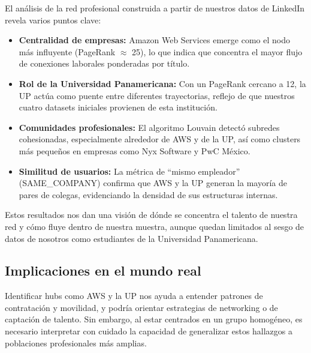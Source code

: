 \documentclass[10pt]{article}
\begin{document}
El análisis de la red profesional construida a partir de nuestros datos de LinkedIn revela varios puntos clave:

\begin{itemize}
	\item \textbf{Centralidad de empresas:} Amazon Web Services emerge como el nodo más influyente (PageRank $\approx$ 25), lo que indica que concentra el mayor flujo de conexiones laborales ponderadas por título.
	\item \textbf{Rol de la Universidad Panamericana:} Con un PageRank cercano a 12, la UP actúa como puente entre diferentes trayectorias, reflejo de que nuestros cuatro datasets iniciales provienen de esta institución.
	\item \textbf{Comunidades profesionales:} El algoritmo Louvain detectó subredes cohesionadas, especialmente alrededor de AWS y de la UP, así como clusters más pequeños en empresas como Nyx Software y PwC México.
	\item \textbf{Similitud de usuarios:} La métrica de “mismo empleador” (SAME\_COMPANY) confirma que AWS y la UP generan la mayoría de pares de colegas, evidenciando la densidad de sus estructuras internas.
\end{itemize}

Estos resultados nos dan una visión de dónde se concentra el talento de nuestra red y cómo fluye dentro de nuestra muestra, aunque quedan limitados al sesgo de datos de nosotros como estudiantes de la Universidad Panamericana.

\subsection{Implicaciones en el mundo real}
Identificar hubs como AWS y la UP nos ayuda a entender patrones de contratación y movilidad, y podría orientar estrategias de networking o de captación de talento. Sin embargo, al estar centrados en un grupo homogéneo, es necesario interpretar con cuidado la capacidad de generalizar estos hallazgos a poblaciones profesionales más amplias.
\end{document}
